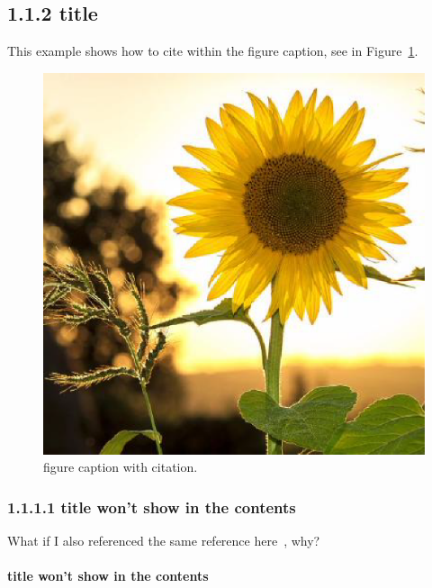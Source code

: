 \documentclass[12pt,openright]{book}
\begin{document}
\subsection{1.1.2 title}

This example shows how to cite within the figure caption, see in Figure~\ref{fig:captioncitation}.

\begin{figure}[htp]
	\centering
	\includegraphics[width=\textwidth]{flower}
	\caption[figure caption with citation.]{figure caption with citation.~\cite{ibge1993}} 
	\label{fig:captioncitation}
\end{figure}

\subsubsection{1.1.1.1 title won't show in the contents}

What if I also referenced the same reference here~\cite{ibge1993}, why?




\paragraph{title won't show in the contents}
\lipsum[1-5]
\end{document}
